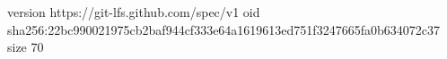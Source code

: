 version https://git-lfs.github.com/spec/v1
oid sha256:22bc990021975cb2baf944cf333e64a1619613ed751f3247665fa0b634072c37
size 70
